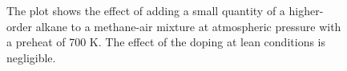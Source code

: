 \begin{figure}

\centering



\caption[- flames - III]{The plot shows the effect of adding a small quantity of a higher-order alkane to a methane-air mixture at atmospheric pressure with a preheat of 700 K. The effect of the doping at lean conditions is negligible.}

\label{fig:c1c2c3}

\end{figure}
